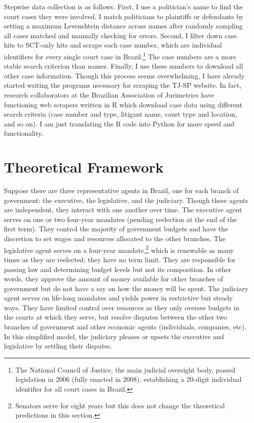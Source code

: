 \documentclass[11pt]{article}
\begin{document}
Stepwise data collection is as follows. First, I use a politician's name to find the court cases they were involved. I match politicians to plaintiffs or defendants by setting a maximum Levenshtein distance across names after randomly sampling all cases matched and manually checking for errors. Second, I filter down case hits to SCT-only hits and scrape each case number, which are individual identifiers for every single court case in Brazil.\footnote{The National Council of Justice, the main judicial oversight body, passed legislation in 2006 (fully enacted in 2008), establishing a 20-digit individual identifier for all court cases in Brazil.} The case numbers are a more stable search criterion than names. Finally, I use these numbers to download all other case information. Though this process seems overwhelming, I have already started writing the programs necessary for scraping the TJ-SP website. In fact, research collaborators at the Brazilian Association of Jurimetrics have functioning web scrapers written in R which download case data using different search criteria (case number and type, litigant name, court type and location, and so on). I am just translating the R code into Python for more speed and functionality.

\section{Theoretical Framework} \label{sec:theory_paper2}

Suppose there are three representative agents in Brazil, one for each branch of government: the executive, the legislative, and the judiciary. Though these agents are independent, they interact with one another over time. The executive agent serves on one or two four-year mandates (pending reelection at the end of the first term). They control the majority of government budgets and have the discretion to set wages and resources allocated to the other branches. The legislative agent serves on a four-year mandate,\footnote{Senators serve for eight years but this does not change the theoretical predictions in this section.} which is renewable as many times as they are reelected; they have no term limit. They are responsible for passing law and determining budget levels but not its composition. In other words, they approve the amount of money available for other branches of government but do not have a say on how the money will be spent. The judiciary agent serves on life-long mandates and yields power in restrictive but steady ways. They have limited control over resources as they only oversee budgets in the courts at which they serve, but resolve disputes between the other two branches of government and other economic agents (individuals, companies, etc). In this simplified model, the judiciary pleases or upsets the executive and legislative by settling their disputes.
\end{document}
